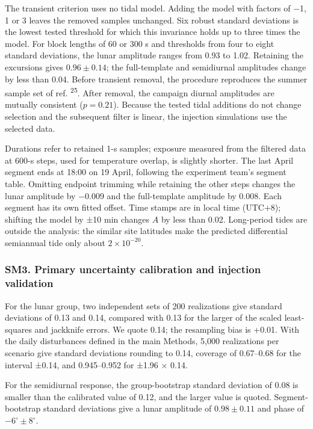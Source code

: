 \documentclass[
  11pt,
  a4paper,
]{article}
\begin{document}
The transient criterion uses no tidal model. Adding the model with
factors of −1, 1 or 3 leaves the removed samples unchanged. Six robust
standard deviations is the lowest tested threshold for which this
invariance holds up to three times the model. For block lengths of 60 or
300 s and thresholds from four to eight standard deviations, the lunar
amplitude ranges from 0.93 to 1.02. Retaining the excursions gives
\(0.96\pm0.14\); the full-template and semidiurnal amplitudes change by
less than 0.04. Before transient removal, the procedure reproduces the
summer sample set of ref. \textsuperscript{25}. After removal, the
campaign diurnal amplitudes are mutually consistent (\(p=0.21\)).
Because the tested tidal additions do not change selection and the
subsequent filter is linear, the injection simulations use the selected
data.

Durations refer to retained 1-s samples; exposure measured from the
filtered data at 600-s steps, used for temperature overlap, is slightly
shorter. The last April segment ends at 18:00 on 19 April, following the
experiment team's segment table. Omitting endpoint trimming while
retaining the other steps changes the lunar amplitude by −0.009 and the
full-template amplitude by 0.008. Each segment has its own fitted
offset. Time stamps are in local time (UTC+8); shifting the model by ±10
min changes \(A\) by less than 0.02. Long-period tides are outside the
analysis: the similar site latitudes make the predicted differential
semiannual tide only about \(2\times10^{-20}\).

\hypertarget{sm3.-primary-uncertainty-calibration-and-injection-validation}{%
\subsubsection{SM3. Primary uncertainty calibration and injection
validation}\label{sm3.-primary-uncertainty-calibration-and-injection-validation}}

For the lunar group, two independent sets of 200 realizations give
standard deviations of 0.13 and 0.14, compared with 0.13 for the larger
of the scaled least-squares and jackknife errors. We quote 0.14; the
resampling bias is +0.01. With the daily disturbances defined in the
main Methods, 5,000 realizations per scenario give standard deviations
rounding to 0.14, coverage of 0.67--0.68 for the interval ±0.14, and
0.945--0.952 for ±1.96 × 0.14.

For the semidiurnal response, the group-bootstrap standard deviation of
0.08 is smaller than the calibrated value of 0.12, and the larger value
is quoted. Segment-bootstrap standard deviations give a lunar amplitude
of \(0.98\pm0.11\) and phase of \(-6^\circ\pm8^\circ\).
\end{document}
